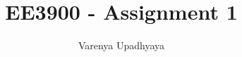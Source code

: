 \documentclass[journal,12pt,twocolumn]{IEEEtran}
\begin{document}

\def\putbox#1#2#3{\makebox[0in][l]{\makebox[#1][l]{}\raisebox{\baselineskip}[0in][0in]{\raisebox{#2}[0in][0in]{#3}}}}
     \def\rightbox#1{\makebox[0in][r]{#1}}
     \def\centbox#1{\makebox[0in]{#1}}
     \def\topbox#1{\raisebox{-\baselineskip}[0in][0in]{#1}}
     \def\midbox#1{\raisebox{-0.5\baselineskip}[0in][0in]{#1}}

\vspace{3cm}

\title{ 
EE3900 - Assignment 1%
}


%
%
%

\author{ Varenya Upadhyaya%
}
% 
%
\end{document}
